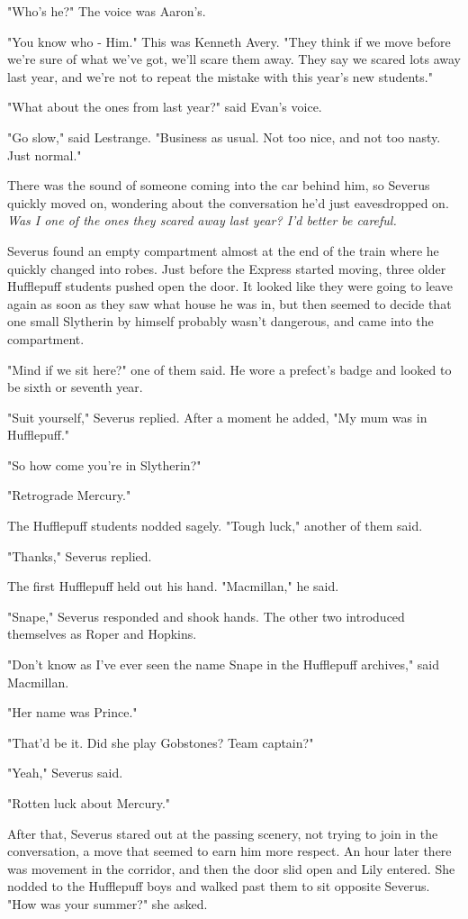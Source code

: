\documentclass[a4paper,11pt]{article}
\begin{document}
"Who's he?" The voice was Aaron's.

"You know who - Him." This was Kenneth Avery. "They think if we move before we're sure of what we've got, we'll scare them away. They say we scared lots away last year, and we're not to repeat the mistake with this year's new students."

"What about the ones from last year?" said Evan's voice.

"Go slow," said Lestrange. "Business as usual. Not too nice, and not too nasty. Just normal."

There was the sound of someone coming into the car behind him, so Severus quickly moved on, wondering about the conversation he'd just eavesdropped on. \emph{Was I one of the ones they scared away last year? I'd better be careful.}

Severus found an empty compartment almost at the end of the train where he quickly changed into robes. Just before the Express started moving, three older Hufflepuff students pushed open the door. It looked like they were going to leave again as soon as they saw what house he was in, but then seemed to decide that one small Slytherin by himself probably wasn't dangerous, and came into the compartment.

"Mind if we sit here?" one of them said. He wore a prefect's badge and looked to be sixth or seventh year.

"Suit yourself," Severus replied. After a moment he added, "My mum was in Hufflepuff."

"So how come you're in Slytherin?"

"Retrograde Mercury."

The Hufflepuff students nodded sagely. "Tough luck," another of them said.

"Thanks," Severus replied.

The first Hufflepuff held out his hand. "Macmillan," he said.

"Snape," Severus responded and shook hands. The other two introduced themselves as Roper and Hopkins.

"Don't know as I've ever seen the name Snape in the Hufflepuff archives," said Macmillan.

"Her name was Prince."

"That'd be it. Did she play Gobstones? Team captain?"

"Yeah," Severus said.

"Rotten luck about Mercury."

After that, Severus stared out at the passing scenery, not trying to join in the conversation, a move that seemed to earn him more respect. An hour later there was movement in the corridor, and then the door slid open and Lily entered. She nodded to the Hufflepuff boys and walked past them to sit opposite Severus. "How was your summer?" she asked.
\end{document}
